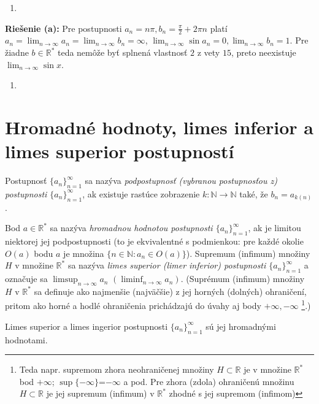 \begin{enumerate}[resume]
  \item {}
\end{enumerate}

\textbf{Riešenie (a):}
Pre postupnosti $a_n=n\pi,b_n=\frac{\pi}{2}+2\pi n$ platí $a_n=\lim_{n \rightarrow \infty} a_n=\lim_{n \rightarrow \infty} b_n=\infty$, $\lim_{n \rightarrow \infty} \sin a_n=0,\lim_{n \rightarrow \infty} b_n=1$. Pre žiadne $b \in \mathbb{R^*}$ teda nemôže byť splnená vlastnosť $2$ z vety $15$, preto neexistuje $\lim_{n \rightarrow \infty} \sin x$.

\begin{enumerate}[resume]
  \item {}
\end{enumerate}

\section{Hromadné hodnoty, limes inferior a limes superior postupností}

Postupnosť ${\{a_n\}}_{n=1}^\infty$ sa nazýva \textit{podpostupnosť (vybranou postupnosťou z) postupnosti ${\{a_n\}}_{n=1}^\infty$}, ak existuje rastúce zobrazenie $k: \mathbb{N} \rightarrow \mathbb{N}$ také, že $b_n=a_{k(n)}$.

Bod $a \in \mathbb{R^*}$ sa nazýva \textit{hromadnou hodnotou postupnosti ${\{a_n\}}_{n=1}^\infty$}, ak je limitou niektorej jej podpostupnosti (to je ekvivalentné s podmienkou: pre každé okolie $O(a)$ bodu $a$ je množina $\{n \in \mathbb{N}: a_n \in O(a) \}$). Supremum (infimum) množiny $H$ v množine $\mathbb{R^*}$ sa nazýva \textit{limes superior (limer inferior) postupnosti ${\{a_n\}}_{n=1}^\infty$} a označuje sa $\limsup_{n \rightarrow \infty} a_n$ $(\liminf_{n \rightarrow \infty} a_n)$. (Suprémum (infimum) množiny $H$ v $\mathbb{R^*}$ sa definuje ako najmenšie (najväčšie) z jej horných (dolných) ohraničení, pritom ako horné a hodlé ohraničenia prichádzajú do úvahy aj body $+\infty,-\infty$ \footnote{Teda napr. supremom zhora neohraničenej množiny $H \subset \mathbb{R}$ je v množine $\mathbb{R^*}$ bod $+\infty$; $\sup\{ -\infty\}$=$-\infty$ a pod. Pre zhora (zdola) ohraničenú množinu $H \subset \mathbb{R}$ je jej supremum (infimum) v $\mathbb{R^*}$ zhodné s jej supremom (infimom)}.)

\begin{veta}
Limes superior a limes ingerior postupnosti ${\{a_n\}}_{n=1}^\infty$ sú jej hromadnými hodnotami.
\end{veta}

